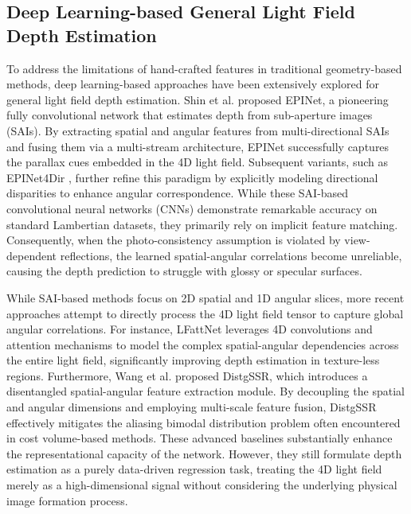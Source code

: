 \subsection{Deep Learning-based General Light Field Depth Estimation}

To address the limitations of hand-crafted features in traditional geometry-based methods, deep learning-based approaches have been extensively explored for general light field depth estimation. Shin et al. \cite{EPINetsubapertureimages} proposed EPINet, a pioneering fully convolutional network that estimates depth from sub-aperture images (SAIs). By extracting spatial and angular features from multi-directional SAIs and fusing them via a multi-stream architecture, EPINet successfully captures the parallax cues embedded in the 4D light field. Subsequent variants, such as EPINet4Dir \cite{EPINet4DirdirectionalSAIs}, further refine this paradigm by explicitly modeling directional disparities to enhance angular correspondence. While these SAI-based convolutional neural networks (CNNs) demonstrate remarkable accuracy on standard Lambertian datasets, they primarily rely on implicit feature matching. Consequently, when the photo-consistency assumption is violated by view-dependent reflections, the learned spatial-angular correlations become unreliable, causing the depth prediction to struggle with glossy or specular surfaces.

While SAI-based methods focus on 2D spatial and 1D angular slices, more recent approaches attempt to directly process the 4D light field tensor to capture global angular correlations. For instance, LFattNet \cite{LFattNet4Dconvolutionattent} leverages 4D convolutions and attention mechanisms to model the complex spatial-angular dependencies across the entire light field, significantly improving depth estimation in texture-less regions. Furthermore, Wang et al. \cite{DistgSSRdisentangledfeatures} proposed DistgSSR, which introduces a disentangled spatial-angular feature extraction module. By decoupling the spatial and angular dimensions and employing multi-scale feature fusion, DistgSSR effectively mitigates the aliasing bimodal distribution problem often encountered in cost volume-based methods. These advanced baselines substantially enhance the representational capacity of the network. However, they still formulate depth estimation as a purely data-driven regression task, treating the 4D light field merely as a high-dimensional signal without considering the underlying physical image formation process.

